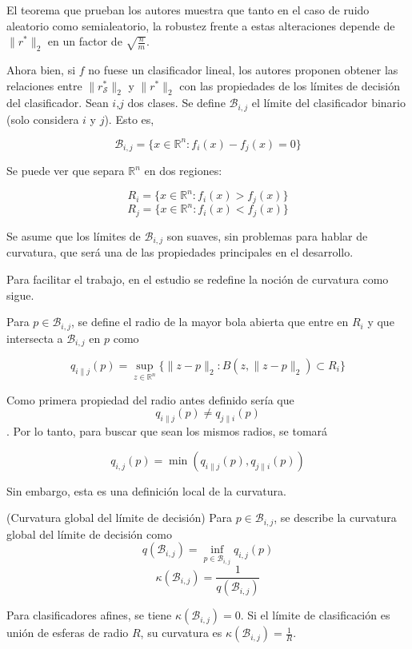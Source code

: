 El teorema que prueban los autores  muestra que tanto en el caso de ruido aleatorio como semialeatorio, la robustez frente a estas alteraciones depende de $\|r^* \|_2$ en un factor de $\sqrt{\frac{n}{m}}$.

Ahora bien, si $f$ no fuese un clasificador lineal, los autores proponen obtener las relaciones entre $\|r_\mathcal{S}^* \|_2$ y $\|r^* \|_2$ con las propiedades de los límites de decisión del clasificador. Sean $i$,$j$ dos clases. Se define $\mathcal{B}_{i,j}$ el límite del clasificador binario (solo considera $i$ y $j$). Esto es,

$$\mathcal{B}_{i,j} = \{x \in \mathbb{R}^n: f_i(x) - f_j(x) = 0\}$$

Se puede ver que separa $\mathbb{R}^n$ en dos regiones:

$$R_i = \{x \in \mathbb{R}^n : f_i(x) > f_j(x)\}$$
$$R_j = \{x \in \mathbb{R}^n: f_i(x) < f_j(x)\}$$

Se asume que los límites de $\mathcal{B}_{i,j}$ son suaves, sin problemas para hablar de curvatura, que será una de las propiedades principales en el desarrollo.

Para facilitar el trabajo, en el estudio se redefine la noción de curvatura como sigue.

\begin{definicion}
Para $p \in \mathcal{B}_{i,j}$, se define el radio de la mayor bola abierta que entre en $R_i$ y que intersecta a $\mathcal{B}_{i,j}$ en $p$ como

$$q_{i \| j}(p) = \sup_{z \in \mathbb{R}^n} \{ \|z-p \|_2 : B(z,\|z-p \|_2) \subset R_i \}$$
\end{definicion}

Como primera propiedad del radio antes definido sería que $$q_{i \| j}(p) \neq q_{j \| i}(p)$$. Por lo tanto, para buscar que sean los mismos radios, se tomará

$$q_{i,j} (p) = \min (q_{i \| j}(p),q_{j \| i}(p))$$

Sin embargo, esta es una definición local de la curvatura.

\begin{definicion}(Curvatura global del límite de decisión)
Para $p \in \mathcal{B}_{i,j}$, se describe la curvatura global del límite de decisión como
$$q(\mathcal{B}_{i,j}) = \inf_{p \in \mathcal{B}_{i,j}} q_{i,j}(p)$$
$$\kappa (\mathcal{B}_{i,j}) = \frac{1}{q(\mathcal{B}_{i,j})}$$
\end{definicion}

Para clasificadores afines, se tiene $\kappa(\mathcal{B}_{i,j})=0$. Si el límite de clasificación es unión de esferas de radio $R$, su curvatura es $\kappa(\mathcal{B}_{i,j})=\frac{1}{R}$.

